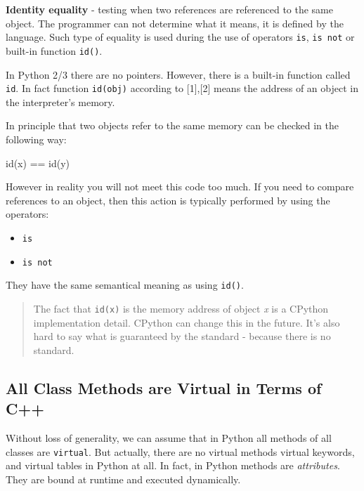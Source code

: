 \documentclass[
]{article}
\newenvironment{Shaded}{}{}
\newcommand{\BuiltInTok}[1]{#1}
\newcommand{\NormalTok}[1]{#1}
\newcommand{\OperatorTok}[1]{\textcolor[rgb]{0.40,0.40,0.40}{#1}}
\begin{document}
\textbf{Identity equality} - testing when two references are referenced
to the same object. The programmer can not determine what it means, it
is defined by the language. Such type of equality is used during the use
of operators \texttt{is}, \texttt{is\ not} or built-in function
\texttt{id()}.

In Python 2/3 there are no pointers. However, there is a built-in
function called \texttt{id}. In fact function \texttt{id(obj)} according
to {[}1{]},{[}2{]} means the address of an object in the interpreter's
memory.

In principle that two objects refer to the same memory can be checked in
the following way:

\begin{Shaded}
\begin{Highlighting}[]
\BuiltInTok{id}\NormalTok{(x) }\OperatorTok{==} \BuiltInTok{id}\NormalTok{(y)}
\end{Highlighting}
\end{Shaded}

However in reality you will not meet this code too much. If you need to
compare references to an object, then this action is typically performed
by using the operators:

\begin{itemize}
\item
  \texttt{is}
\item
  \texttt{is\ not}
\end{itemize}

They have the same semantical meaning as using \texttt{id()}.

\begin{quote}
The fact that \texttt{id(x)} is the memory address of object \emph{x} is
a CPython implementation detail. CPython can change this in the future.
It's also hard to say what is guaranteed by the standard - because there
is no standard.
\end{quote}

\hypertarget{all-class-methods-are-virtual-in-terms-of-c}{%
\subsection{All Class Methods are Virtual in Terms of
C++}\label{all-class-methods-are-virtual-in-terms-of-c}}

Without loss of generality, we can assume that in Python all methods of
all classes are \texttt{virtual}. But actually, there are no virtual
methods virtual keywords, and virtual tables in Python at all. In fact,
in Python methods are \emph{attributes}. They are bound at runtime and
executed dynamically.
\end{document}
